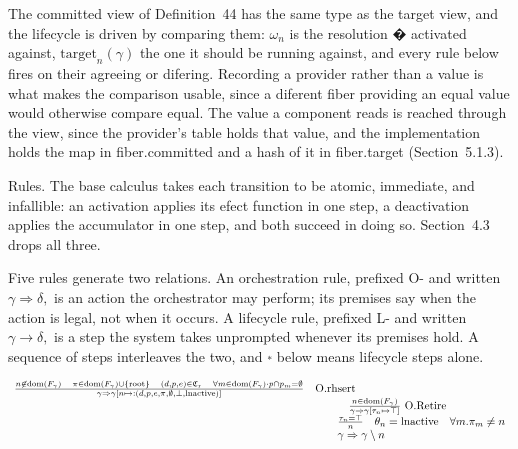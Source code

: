 \documentclass[
  10
]{article}
\begin{document}
The committed view of Definition~44 has the same type as the target
view, and the lifecycle is driven by comparing them: \(\omega _ { n }\)
is the resolution � activated against,
\(\mathrm { t a r g e t } _ { n } ( \gamma )\) the one it should be
running against, and every rule below fires on their agreeing or
difering. Recording a provider rather than a value is what makes the
comparison usable, since a diferent fiber providing an equal value would
otherwise compare equal. The value a component reads is reached through
the view, since the provider's table holds that value, and the
implementation holds the map in fiber.committed and a hash of it in
fiber.target (Section~5.1.3).

Rules. The base calculus takes each transition to be atomic, immediate,
and infallible: an activation applies its efect function in one step, a
deactivation applies the accumulator in one step, and both succeed in
doing so. Section~4.3 drops all three.

Five rules generate two relations. An orchestration rule, prefixed O-
and written \(\gamma \Rightarrow \delta ,\) is an action the
orchestrator may perform; its premises say when the action is legal, not
when it occurs. A lifecycle rule, prefixed L- and written
\(\gamma \longrightarrow \delta ,\) is a step the system takes
unprompted whenever its premises hold. A sequence of steps interleaves
the two, and \(\stackrel { * } {  }\) below means lifecycle steps alone.

\[
\begin{array} { r l } { \frac { n \not \in \mathrm { d o m } \left( F _ { \gamma } \right) \quad \pi \in \mathrm { d o m } \left( F _ { \gamma } \right) \cup \{ \mathrm { r o o t } \} \quad ( d , p , e ) \in \mathfrak { C } _ { \mathrm { r } } \quad \forall m \in \mathrm { d o m } \left( F _ { \gamma } \right) \cdot p \cap p _ { m } = \emptyset } { \gamma \Rightarrow \gamma [ n \mapsto : ( d , p , e , \pi , \emptyset , \bot , \mathrm { l n a c t i v e } ) ] } } & { { \mathrm { O . r h } \mathrm { s e r t } } } \\ & { \qquad \quad \frac { n \in \mathrm { d o m } \left( F _ { \gamma } \right) } { \gamma \Rightarrow \gamma [ \tau _ { n } \mapsto \top ] } \mathrm { ~ O . R e t i r e } } \\ & { \qquad \frac { \tau _ { n } = \top } { n } \quad \theta _ { n } = \mathrm { l n a c t i v e } \quad \forall m . \pi _ { m } \neq n } \\ & { \qquad \gamma \Rightarrow \gamma \setminus n } \end{array}
\]
\end{document}
